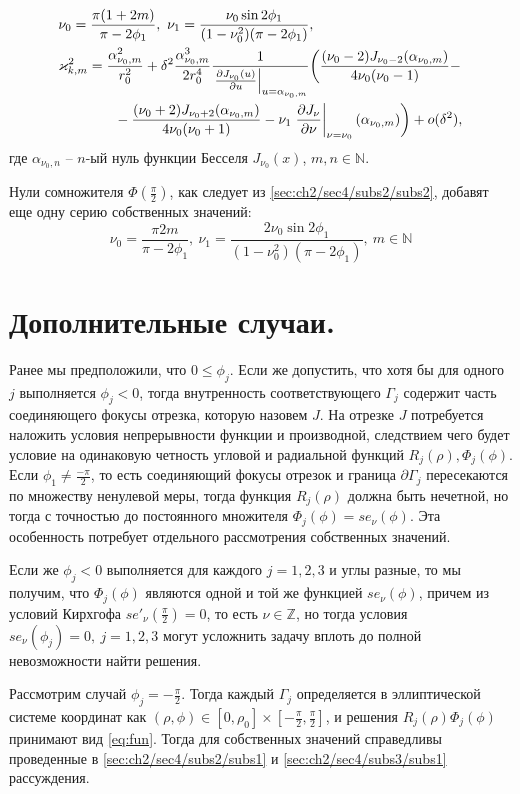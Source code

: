 \begin{align}
  & \nu_0 = \frac{\pi(1 + 2m)}{\pi-2 \phi_1},  \  \nu_1 = \dfrac{\nu_0 \sin 2\phi_1}{(1-\nu_0^2)(\pi-2\phi_1)},\\
   & \varkappa_{k, m}^2 = \frac{\alpha_{\nu_0, m}^2}{r_0^2} 
+  \delta^2 \frac{\alpha_{\nu_0, m}^3}{2 r_0^4}\frac{1}{ \left.\frac{\partial J_{\nu_0}(u)}{\partial u}\right|_{u=\alpha_{\nu_0, m}} } \biggl(
\frac{(\nu_0 - 2)J_{\nu_0-2}(\alpha_{\nu_0, m})   }{4\nu_0 (\nu_0-1)} - \notag \\
&\qquad\qquad{}- \frac{(\nu_0 + 2)J_{\nu_0+2}(\alpha_{\nu_0, m})}{4\nu_0 (\nu_0+1)} - \nu_1 \left.\frac{\partial J_\nu}{\partial \nu}\right|_{\nu = \nu_0}(\alpha_{\nu_0, m})
    \biggr) + o(\delta^2),
 \end{align}
где $\alpha_{\nu_0, n}$ -- $n$-ый нуль функции Бесселя $J_{\nu_0}(x)$, $m, n \in \mathbb{N}$.

Нули сомножителя $\Phi(\frac{\pi}{2})$, как следует из  \ref{sec:ch2/sec4/subs2/subs2}, добавят еще одну серию собственных значений:
$$ \nu_0 = \frac{\pi 2m}{\pi-2 \phi_1},  \  \nu_1 = \dfrac{2 \nu_0  \sin 2\phi_1}{(1-\nu_0^2)(\pi-2\phi_1)}, \ m \in \mathbb{N}$$

\section{Дополнительные случаи.}\label{sec:ch6/sect4}
Ранее мы предположили, что $0 \leq \phi_j$. Если же допустить, что хотя бы для одного $j$ выполняется $\phi_j < 0$, тогда внутренность соответствующего $\Gamma_j$ содержит часть соединяющего фокусы отрезка, которую назовем $J$. На отрезке $J$ потребуется наложить условия непрерывности функции и производной, следствием чего будет условие на одинаковую четность угловой и радиальной функций $R_j(\rho), \Phi_j(\phi)$. Если $\phi_1 \neq \frac{-\pi}{2}$, то есть соединяющий фокусы отрезок  и граница $\partial \Gamma_j$ пересекаются по множеству ненулевой меры, тогда функция $R_j(\rho)$ должна быть нечетной, но тогда с точностью до постоянного множителя $\Phi_j(\phi) = se_\nu(\phi)$. Эта особенность потребует отдельного рассмотрения собственных значений.

Если же  $\phi_j < 0$ выполняется для каждого $j=1,2,3$ и углы разные, то мы получим, что $\Phi_j(\phi)$ являются одной и той же функцией $se_\nu(\phi)$, причем из условий Кирхгофа $se'_\nu(\frac{\pi}{2}) = 0$, то есть $\nu \in \mathbb{Z}$, но тогда условия $se_\nu(\phi_j) = 0, \ j=1,2,3$ могут усложнить задачу вплоть до полной невозможности найти решения.

Рассмотрим случай $\phi_j = -\frac{\pi}{2}$. Тогда  каждый $\Gamma_j$ определяется в эллиптической системе координат как $(\rho, \phi) \in [0,\rho_0] \times [-\frac{\pi}{2}, \frac{\pi}{2}]$, и решения $R_j(\rho)\Phi_j(\phi)$ принимают вид \eqref{eq:fun}.
Тогда для собственных значений справедливы проведенные в  \ref{sec:ch2/sec4/subs2/subs1} и \ref{sec:ch2/sec4/subs3/subs1} рассуждения.

\clearpage
